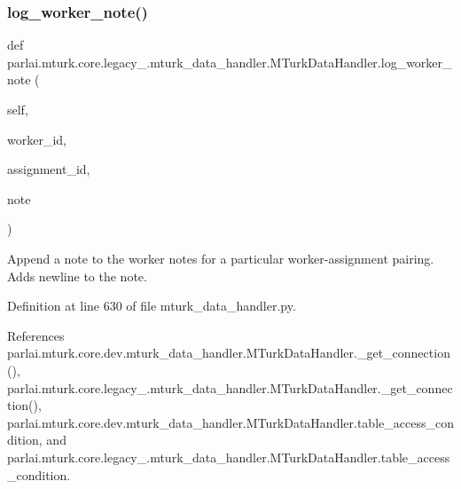 \subsubsection{\texorpdfstring{log\+\_\+worker\+\_\+note()}{log\_worker\_note()}}
{\footnotesize\ttfamily def parlai.\+mturk.\+core.\+legacy\+\_.\+mturk\+\_\+data\+\_\+handler.\+M\+Turk\+Data\+Handler.\+log\+\_\+worker\+\_\+note (\begin{DoxyParamCaption}\item[{}]{self,  }\item[{}]{worker\+\_\+id,  }\item[{}]{assignment\+\_\+id,  }\item[{}]{note }\end{DoxyParamCaption})}

\begin{DoxyVerb}Append a note to the worker notes for a particular worker-assignment
pairing. Adds newline to the note.
\end{DoxyVerb}
 

Definition at line 630 of file mturk\+\_\+data\+\_\+handler.\+py.



References parlai.\+mturk.\+core.\+dev.\+mturk\+\_\+data\+\_\+handler.\+M\+Turk\+Data\+Handler.\+\_\+get\+\_\+connection(), parlai.\+mturk.\+core.\+legacy\+\_.\+mturk\+\_\+data\+\_\+handler.\+M\+Turk\+Data\+Handler.\+\_\+get\+\_\+connection(), parlai.\+mturk.\+core.\+dev.\+mturk\+\_\+data\+\_\+handler.\+M\+Turk\+Data\+Handler.\+table\+\_\+access\+\_\+condition, and parlai.\+mturk.\+core.\+legacy\+\_.\+mturk\+\_\+data\+\_\+handler.\+M\+Turk\+Data\+Handler.\+table\+\_\+access\+\_\+condition.

